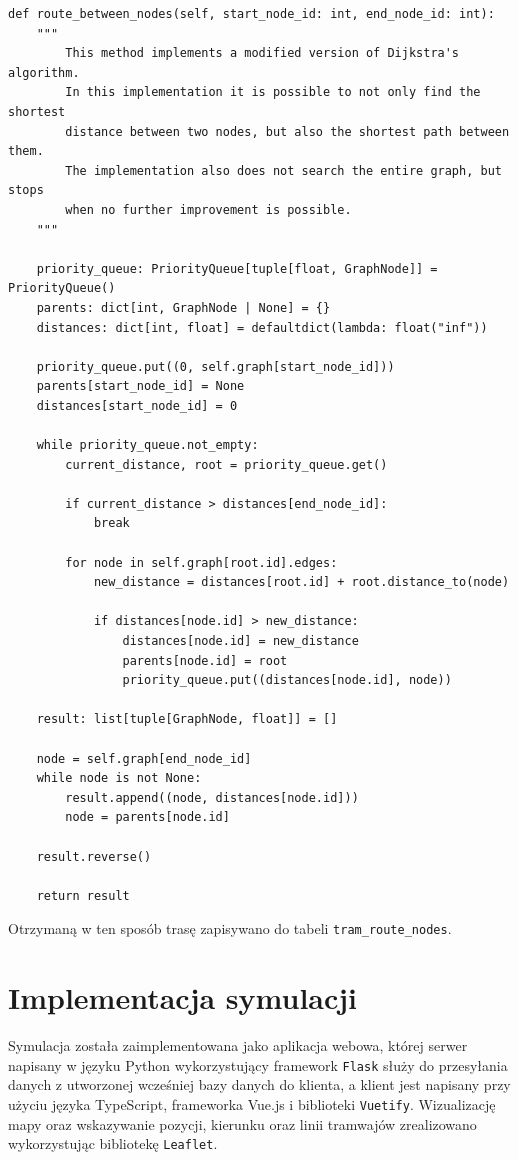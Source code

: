 \documentclass[12pt,a4paper]{article}
\begin{document}
\begin{verbatim}
def route_between_nodes(self, start_node_id: int, end_node_id: int):
    """
        This method implements a modified version of Dijkstra's algorithm.
        In this implementation it is possible to not only find the shortest
        distance between two nodes, but also the shortest path between them.
        The implementation also does not search the entire graph, but stops
        when no further improvement is possible.
    """

    priority_queue: PriorityQueue[tuple[float, GraphNode]] = PriorityQueue()
    parents: dict[int, GraphNode | None] = {}
    distances: dict[int, float] = defaultdict(lambda: float("inf"))

    priority_queue.put((0, self.graph[start_node_id]))
    parents[start_node_id] = None
    distances[start_node_id] = 0

    while priority_queue.not_empty:
        current_distance, root = priority_queue.get()

        if current_distance > distances[end_node_id]:
            break

        for node in self.graph[root.id].edges:
            new_distance = distances[root.id] + root.distance_to(node)

            if distances[node.id] > new_distance:
                distances[node.id] = new_distance
                parents[node.id] = root
                priority_queue.put((distances[node.id], node))

    result: list[tuple[GraphNode, float]] = []

    node = self.graph[end_node_id]
    while node is not None:
        result.append((node, distances[node.id]))
        node = parents[node.id]

    result.reverse()

    return result
\end{verbatim}

            Otrzymaną w ten sposób trasę zapisywano do tabeli \texttt{tram\_route\_nodes}.

    \section{Implementacja symulacji}
        Symulacja została zaimplementowana jako aplikacja webowa, której serwer napisany w języku Python wykorzystujący framework \texttt{Flask}\cite{flask} służy do przesyłania danych z utworzonej wcześniej bazy danych do klienta, a klient jest napisany przy użyciu języka TypeScript, frameworka Vue.js i biblioteki \texttt{Vuetify}\cite{vuetify}. Wizualizację mapy oraz wskazywanie pozycji, kierunku oraz linii tramwajów zrealizowano wykorzystując bibliotekę \texttt{Leaflet}\cite{leaflet}.
\end{document}
